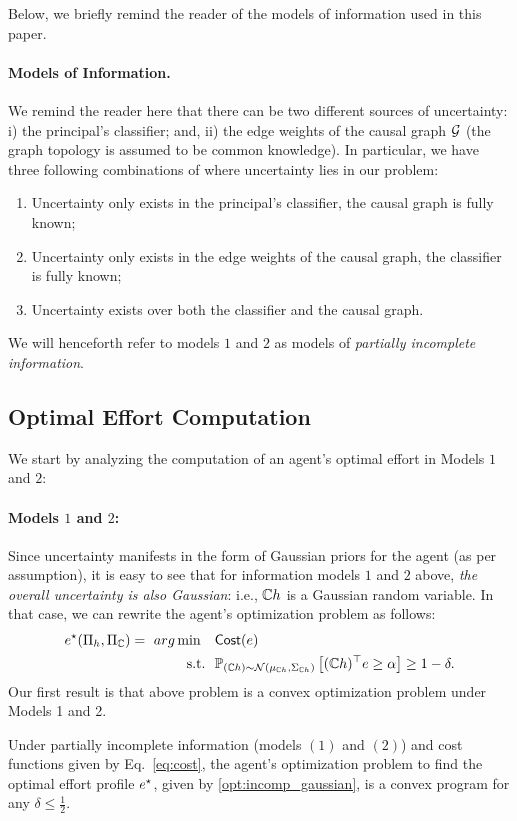 Below, we briefly remind the reader of the models of information used in this paper.

\paragraph{Models of Information.} We remind the reader here that there can be two different sources of uncertainty: i) the principal's classifier; and, ii)  the edge weights of the causal graph $\mathcal{G}$ (the graph topology is assumed to be common knowledge). In particular, we have three following combinations of where uncertainty lies in our problem:
\begin{enumerate}
    \item Uncertainty only exists in the principal's classifier, the causal graph is fully known;
    \item Uncertainty only exists in the edge weights of the causal graph, the classifier is fully known; 
    \item Uncertainty exists over both the classifier and the causal graph.
\end{enumerate}
We will henceforth refer to models $1$ and $2$ as models of \textit{partially incomplete information}. 

\subsection{Optimal Effort Computation}

We start by analyzing the computation of an agent's optimal effort in Models $1$ and $2$:

\paragraph{Models $1$ and $2$:} Since uncertainty manifests in the form of Gaussian priors for the agent (as per assumption), it is easy to see that for information models $1$ and $2$ above, \textit{the overall uncertainty is also Gaussian}: i.e., $\mathbb{C} h$ is a Gaussian random variable. In that case, we can rewrite the agent's optimization problem as follows: 
\begin{align}\label{opt:incomp_gaussian}
    e^{\star}(\Pi_h, \Pi_{\mathbb{C}}) = ~arg\min \quad &\textsf{Cost}(e) \\
    \text{s.t.}~~& \mathbb{P}_{(\mathbb{C} h) \sim \mathcal{N}(\mu_{\mathbb{C} h}, \Sigma_{\mathbb{C} h})} \left[ (\mathbb{C} h)^{\top}e \geq \alpha \right] \geq 1-\delta. \nonumber
\end{align}
Our first result is that above problem is a convex optimization problem under Models 1 and 2. 
\begin{lem}\label{lem:partial_incomp_convex}
Under partially incomplete information (models $(1)$ and $(2)$) and cost functions given by Eq.~\eqref{eq:cost}, the agent's optimization problem to find the optimal effort profile $e^{\star}$, given by \eqref{opt:incomp_gaussian}, is a convex program for any $\delta \leq \frac{1}{2}$. 
\end{lem}


